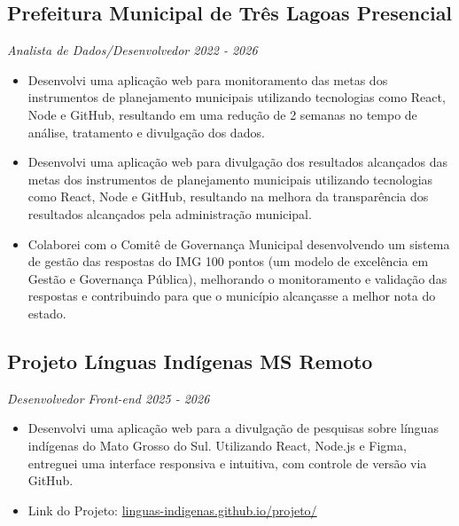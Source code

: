 \documentclass[a4paper,10pt]{article}
\begin{document}
    \subsection*{\texorpdfstring{
            \textbf{Prefeitura Municipal de Três Lagoas} \hfill Presencial
        }{
            Prefeitura Municipal de Três Lagoas -- Três Lagoas/MS
        }}
    \textit{Analista de Dados/Desenvolvedor \hfill 2022 - 2026}
        \begin{itemize} 
            \item Desenvolvi uma aplicação web para monitoramento das metas dos instrumentos de planejamento municipais utilizando tecnologias como React, Node e GitHub, resultando em uma redução de 2 semanas no tempo de análise, tratamento e divulgação dos dados.
            \item Desenvolvi uma aplicação web para divulgação dos resultados alcançados das metas dos instrumentos de planejamento municipais utilizando tecnologias como React, Node e GitHub, resultando na melhora da transparência dos resultados alcançados pela administração municipal.
            \item Colaborei com o Comitê de Governança Municipal desenvolvendo um sistema de gestão das respostas do IMG 100 pontos (um modelo de excelência em Gestão e Governança Pública), melhorando o monitoramento e validação das respostas e contribuindo para que o município alcançasse a melhor nota do estado.
        \end{itemize}

        
    \subsection*{\texorpdfstring{
        	\textbf{Projeto Línguas Indígenas MS} \hfill Remoto
        }{
            Universidade Federal de Mato Grosso do Sul -- Remoto
        }}
    \textit{Desenvolvedor Front-end \hfill 2025 - 2026}
        \begin{itemize}
             \item Desenvolvi uma aplicação web para a divulgação de pesquisas sobre línguas indígenas do Mato Grosso do Sul. Utilizando React, Node.js e Figma, entreguei uma interface responsiva e intuitiva, com controle de versão via GitHub.
           \item Link do Projeto: \href{https://linguas-indigenas.github.io/projeto/}{linguas-indigenas.github.io/projeto/}
        \end{itemize}
     
\end{document}
